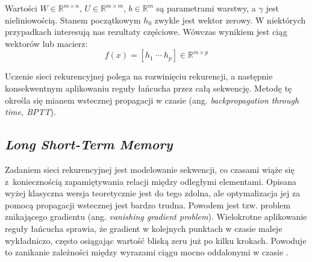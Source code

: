 Wartości $W \in \mathbb{R}^{m \times n}$, $U \in \mathbb{R}^{m \times m}$, $b \in \mathbb{R}^m$ są parametrami warstwy, a $\gamma$ jest nieliniowością. Stanem początkowym $h_0$ zwykle jest wektor zerowy. W niektórych przypadkach interesują nas rezultaty częściowe. Wówczas wynikiem jest ciąg wektorów lub macierz:
\[f(x) = [h_1\ \dotsb\ h_p] \in \mathbb{R}^{m \times p}\]

Uczenie sieci rekurencyjnej polega na rozwinięciu rekurencji, a następnie konsekwentnym aplikowaniu reguły łańcucha przez całą sekwencję. Metodę tę określa się mianem wstecznej propagacji w czasie (ang. \textit{backpropagation through time, BPTT}).


\subsection{\textit{Long Short-Term Memory}} \label{lstm}
Zadaniem sieci rekurencyjnej jest modelowanie sekwencji, co czasami wiąże się z~koniecznością zapamiętywania relacji między odległymi elementami. Opisana wyżej klasyczna wersja teoretycznie jest do tego zdolna, ale optymalizacja jej za pomocą propagacji wstecznej jest bardzo trudna. Powodem jest tzw. problem znikającego gradientu (ang. \textit{vanishing gradient problem}). Wielokrotne aplikowanie reguły łańcucha sprawia, że gradient w kolejnych punktach w czasie maleje wykładniczo, często osiągając wartość bliską zeru już po kilku krokach. Powoduje to zanikanie zależności między wyrazami ciągu mocno oddalonymi w czasie \cite{hardrnn}.

